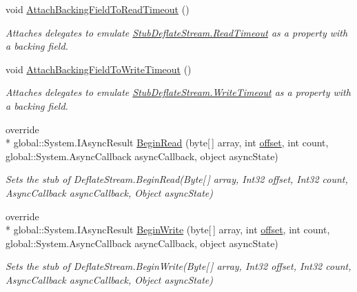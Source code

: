 \begin{DoxyCompactItemize}
void \hyperlink{class_system_1_1_i_o_1_1_compression_1_1_fakes_1_1_stub_deflate_stream_a7396738946b83501dec9fba7737f71c1}{Attach\-Backing\-Field\-To\-Read\-Timeout} ()
\begin{DoxyCompactList}\small\item\em Attaches delegates to emulate \hyperlink{class_system_1_1_i_o_1_1_compression_1_1_fakes_1_1_stub_deflate_stream_a3b9ec10d2cebdff191a5854c3024906c}{Stub\-Deflate\-Stream.\-Read\-Timeout} as a property with a backing field.\end{DoxyCompactList}\item 
void \hyperlink{class_system_1_1_i_o_1_1_compression_1_1_fakes_1_1_stub_deflate_stream_aee5c59e27ec41e124dcd4666baf4acdb}{Attach\-Backing\-Field\-To\-Write\-Timeout} ()
\begin{DoxyCompactList}\small\item\em Attaches delegates to emulate \hyperlink{class_system_1_1_i_o_1_1_compression_1_1_fakes_1_1_stub_deflate_stream_a65da4934280057e00100a1ecdc793b9b}{Stub\-Deflate\-Stream.\-Write\-Timeout} as a property with a backing field.\end{DoxyCompactList}\item 
override \\*
global\-::\-System.\-I\-Async\-Result \hyperlink{class_system_1_1_i_o_1_1_compression_1_1_fakes_1_1_stub_deflate_stream_a15fd1dbfe5c6c167235b91e4ce1b7260}{Begin\-Read} (byte\mbox{[}$\,$\mbox{]} array, int \hyperlink{jquery-1_810_82_8js_a4a9f594d20d927164551fc7fa4751a2f}{offset}, int count, global\-::\-System.\-Async\-Callback async\-Callback, object async\-State)
\begin{DoxyCompactList}\small\item\em Sets the stub of Deflate\-Stream.\-Begin\-Read(\-Byte\mbox{[}$\,$\mbox{]} array, Int32 offset, Int32 count, Async\-Callback async\-Callback, Object async\-State)\end{DoxyCompactList}\item 
override \\*
global\-::\-System.\-I\-Async\-Result \hyperlink{class_system_1_1_i_o_1_1_compression_1_1_fakes_1_1_stub_deflate_stream_aa604be335b822d0fe0bba64e8ee2770d}{Begin\-Write} (byte\mbox{[}$\,$\mbox{]} array, int \hyperlink{jquery-1_810_82_8js_a4a9f594d20d927164551fc7fa4751a2f}{offset}, int count, global\-::\-System.\-Async\-Callback async\-Callback, object async\-State)
\begin{DoxyCompactList}\small\item\em Sets the stub of Deflate\-Stream.\-Begin\-Write(\-Byte\mbox{[}$\,$\mbox{]} array, Int32 offset, Int32 count, Async\-Callback async\-Callback, Object async\-State)\end{DoxyCompactList}\item 

\end{DoxyCompactItemize}
